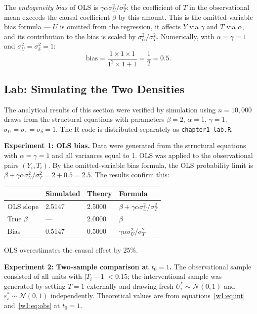 \documentclass[master.tex]{subfiles}
\begin{document}
\medskip
The \emph{endogeneity bias} of OLS is $\gamma\alpha\sigma_U^2/\sigma_T^2$:
the coefficient of $T$ in the observational mean exceeds the causal
coefficient $\beta$ by this amount.  This is the omitted-variable bias
formula --- $U$ is omitted from the regression, it affects $Y$ via
$\gamma$ and $T$ via $\alpha$, and its contribution to the bias is scaled
by $\sigma_U^2/\sigma_T^2$.  Numerically, with $\alpha = \gamma = 1$ and
$\sigma_U^2 = \sigma_\delta^2 = 1$:
\[
  \text{bias} = \frac{1 \times 1 \times 1}{1^2 \times 1 + 1} = \frac{1}{2} = 0.5.
\]

\subsection{Lab: Simulating the Two Densities}

The analytical results of this section were verified by simulation using
$n = 10{,}000$ draws from the structural equations with parameters
$\beta = 2$, $\alpha = 1$, $\gamma = 1$,
$\sigma_U = \sigma_\varepsilon = \sigma_\delta = 1$.
The R code is distributed separately as \texttt{chapter1\_lab.R}.

\medskip
\noindent\textbf{Experiment 1: OLS bias.}
Data were generated from the structural equations with $\alpha=\gamma=1$
and all variances equal to 1.  OLS was applied to the observational pairs
$(Y_i, T_i)$.  By the omitted-variable bias formula, the OLS probability
limit is $\beta + \gamma\alpha\sigma_U^2/\sigma_T^2 = 2 + 0.5 = 2.5$.
The results confirm this:

\begin{center}
\renewcommand{\arraystretch}{1.3}
\begin{tabular}{@{}llll@{}}
\toprule
            & \textbf{Simulated} & \textbf{Theory} & \textbf{Formula} \\
\midrule
OLS slope   & 2.5147  & 2.5000  & $\beta + \gamma\alpha\sigma_U^2/\sigma_T^2$ \\
True $\beta$& ---     & 2.0000  & $\beta$ \\
Bias        & 0.5147  & 0.5000  & $\gamma\alpha\sigma_U^2/\sigma_T^2$ \\
\bottomrule
\end{tabular}
\end{center}

\noindent
OLS overestimates the causal effect by 25\%.

\medskip
\noindent\textbf{Experiment 2: Two-sample comparison at $t_0 = 1$.}
The observational sample consisted of all units with $|T_i - 1| < 0.15$;
the interventional sample was generated by setting $T = 1$ externally
and drawing fresh $U^*_i \sim \mathcal{N}(0,1)$ and
$\varepsilon^*_i \sim \mathcal{N}(0,1)$ independently.
Theoretical values are from equations~\eqref{w1:eq:int}
and~\eqref{w1:eq:obs} at $t_0 = 1$.
\end{document}
